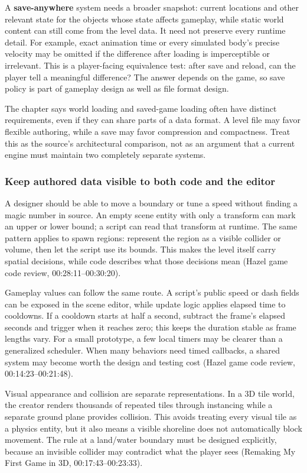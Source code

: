 A \textbf{save-anywhere} system needs a broader snapshot: current locations and other relevant state for the objects whose state affects gameplay, while static world content can still come from the level data. It need not preserve every runtime detail. For example, exact animation time or every simulated body's precise velocity may be omitted if the difference after loading is imperceptible or irrelevant. This is a player-facing equivalence test: after save and reload, can the player tell a meaningful difference? The answer depends on the game, so save policy is part of gameplay design as well as file format design.

The chapter says world loading and saved-game loading often have distinct requirements, even if they can share parts of a data format. A level file may favor flexible authoring, while a save may favor compression and compactness. Treat this as the source's architectural comparison, not as an argument that a current engine must maintain two completely separate systems.

\subsubsection{Keep authored data visible to both code and the editor}\label{06-engine-ii-ch031-keep-authored-data-visible-to-both-code-and-the-editor}

A designer should be able to move a boundary or tune a speed without finding a magic number in source. An empty scene entity with only a transform can mark an upper or lower bound; a script can read that transform at runtime. The same pattern applies to spawn regions: represent the region as a visible collider or volume, then let the script use its bounds. This makes the level itself carry spatial decisions, while code describes what those decisions mean (Hazel game code review, 00:28:11--00:30:20).

Gameplay values can follow the same route. A script's public speed or dash fields can be exposed in the scene editor, while update logic applies elapsed time to cooldowns. If a cooldown starts at half a second, subtract the frame's elapsed seconds and trigger when it reaches zero; this keeps the duration stable as frame lengths vary. For a small prototype, a few local timers may be clearer than a generalized scheduler. When many behaviors need timed callbacks, a shared system may become worth the design and testing cost (Hazel game code review, 00:14:23--00:21:48).

Visual appearance and collision are separate representations. In a 3D tile world, the creator renders thousands of repeated tiles through instancing while a separate ground plane provides collision. This avoids treating every visual tile as a physics entity, but it also means a visible shoreline does not automatically block movement. The rule at a land/water boundary must be designed explicitly, because an invisible collider may contradict what the player sees (Remaking My First Game in 3D, 00:17:43--00:23:33).


